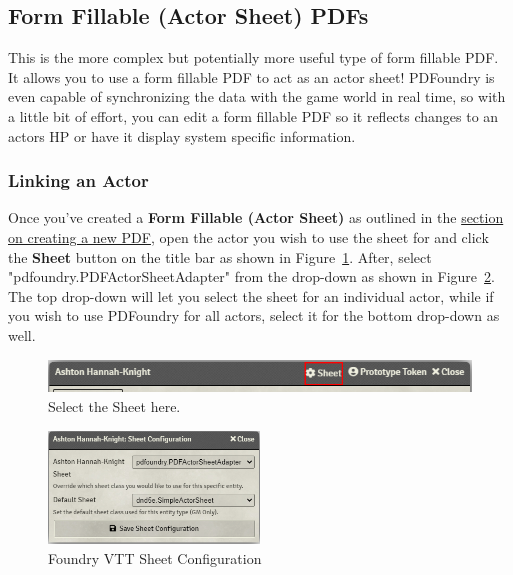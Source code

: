 \documentclass{article}
\begin{document}
    \subsection{Form Fillable (Actor Sheet) PDFs}
    This is the more complex but potentially more useful type of form fillable PDF. It allows you to use a form fillable PDF to act as an actor sheet! PDFoundry is even capable of synchronizing the data with the game world in real time, so with a little bit of effort, you can edit a form fillable PDF so it reflects changes to an actors HP or have it display system specific information.

    \subsubsection{Linking an Actor}
    Once you've created a \textbf{Form Fillable (Actor Sheet)} as outlined in the \hyperref[sec:creating-opening-pdfs]{section on creating a new PDF}, open the actor you wish to use the sheet for and click the \textbf{Sheet} button on the title bar as shown in Figure~\ref{fig:actor-sheet-header}. After, select "pdfoundry.PDFActorSheetAdapter" from the drop-down as shown in Figure~\ref{fig:actor-sheet-select}. The top drop-down will let you select the sheet for an individual actor, while if you wish to use PDFoundry for all actors, select it for the bottom drop-down as well.

    \begin{figure}[h]
        \centering
        \includegraphics[width=1\textwidth]{images/actor-sheet-header.png}
        \caption{Select the Sheet here.}
        \label{fig:actor-sheet-header}
    \end{figure}

    \begin{figure}[h]
        \centering
        \includegraphics[width=0.5\textwidth]{images/actor-sheet-select.png}
        \caption{Foundry VTT Sheet Configuration}
        \label{fig:actor-sheet-select}
    \end{figure}
\end{document}
